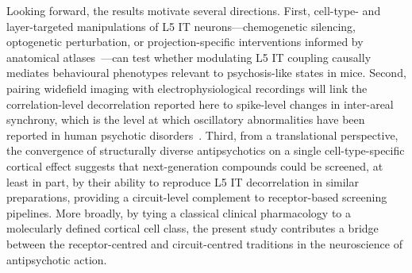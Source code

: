 \documentclass[11pt]{article}
\begin{document}
Looking forward, the results motivate several directions. First, cell-type- and layer-targeted manipulations of L5 IT neurons---chemogenetic silencing, optogenetic perturbation, or projection-specific interventions informed by anatomical atlases~\citep{liu2024celltype, harris2019hierarchical, matho2021genetic}---can test whether modulating L5 IT coupling causally mediates behavioural phenotypes relevant to psychosis-like states in mice. Second, pairing widefield imaging with electrophysiological recordings will link the correlation-level decorrelation reported here to spike-level changes in inter-areal synchrony, which is the level at which oscillatory abnormalities have been reported in human psychotic disorders~\citep{uhlhaas2015oscillations, uhlhaas2013highfrequency}. Third, from a translational perspective, the convergence of structurally diverse antipsychotics on a single cell-type-specific cortical effect suggests that next-generation compounds could be screened, at least in part, by their ability to reproduce L5 IT decorrelation in similar preparations, providing a circuit-level complement to receptor-based screening pipelines. More broadly, by tying a classical clinical pharmacology to a molecularly defined cortical cell class, the present study contributes a bridge between the receptor-centred and circuit-centred traditions in the neuroscience of antipsychotic action.



\end{document}
